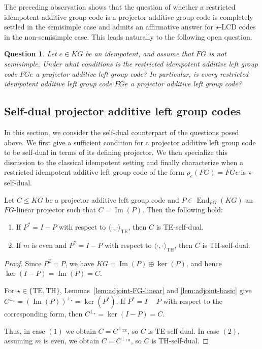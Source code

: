 \documentclass[11pt]{article}
\newtheorem{question}[theorem]{Question}}
\begin{document}
The preceding observation shows that the question of whether a restricted
idempotent additive group code is a projector additive group code is
completely settled in the semisimple case and admits an affirmative answer
for $\star$-LCD codes in the non-semisimple case. This leads naturally to the
following open question.




\begin{question}\label{que:restricted-idempotent-projector}
Let $e\in KG$ be an idempotent, and assume that $FG$ is not semisimple.
Under what conditions is the restricted idempotent additive left group code
$FGe$ a projector additive left group code? In particular, is every
restricted idempotent additive left group code $FGe$ a projector additive
left group code?
\end{question}




\subsection{Self-dual projector additive left group codes}

In this section, we consider the self-dual counterpart of the questions posed above. We first give a sufficient condition for a projector additive left group code to be self-dual in terms of its defining projector. We then specialize this discussion to the classical idempotent setting and finally characterize when a restricted idempotent additive left group code of the form $\rho_e(FG)=FGe$ is $\star$-self-dual.

\begin{proposition}\label{prop:projector-selfdual}
Let $C\le KG$ be a projector additive left group code and $P\in\operatorname{End}_{FG}(KG)$ an $FG$-linear projector such that
$
C=\operatorname{Im}(P).
$
Then the following hold:
\begin{enumerate}
    \item If $P^\ast=I-P$ with respect to $\langle\cdot,\cdot\rangle_{\mathrm{TE}}$, then $C$ is TE-self-dual.
    \item If $m$ is even and $P^\ast=I-P$ with respect to $\langle\cdot,\cdot\rangle_{\mathrm{TH}}$, then $C$ is TH-self-dual.
\end{enumerate}
\end{proposition}

\begin{proof}
Since $P^2=P$, we have $KG=\operatorname{Im}(P)\oplus\ker(P)$, and hence $\ker(I-P)=\operatorname{Im}(P)=C$.

For $\star\in\{\mathrm{TE},\mathrm{TH}\}$, Lemmas~\ref{lem:adjoint-FG-linear} and \ref{lem:adjoint-basic} give
$
C^{\perp_\star}=(\operatorname{Im}(P))^{\perp_\star}=\ker(P^\ast).
$
If $P^\ast=I-P$ with respect to the corresponding form, then
$
C^{\perp_\star}=\ker(I-P)=C.
$

Thus, in case $(1)$ we obtain $C=C^{\perp_{\mathrm{TE}}}$, so $C$ is TE-self-dual. In case $(2)$, assuming $m$ is even, we obtain $C=C^{\perp_{\mathrm{TH}}}$, so $C$ is TH-self-dual.
\end{proof}
\end{document}
